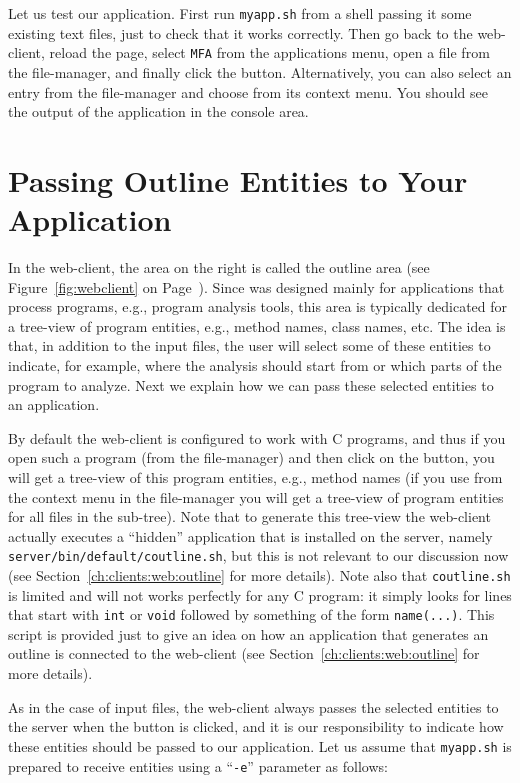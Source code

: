 Let us test our application. First run \texttt{myapp.sh} from a shell
passing it some existing text files, just to check that it works
correctly.
%
Then go back to the web-client, reload the page, select \texttt{MFA}
from the applications menu, open a file from the file-manager, and
finally click the \applybutton button. Alternatively, you can also
select an entry from the file-manager and choose \applybutton from its
context menu. You should see the output of the application in the
console area.

\section{Passing Outline Entities to Your Application}

In the web-client, the area on the right is called the outline area
(see Figure~\ref{fig:webclient} on Page~\pageref{fig:webclient}).
%
Since \ei was designed mainly for applications that process programs,
e.g., program analysis tools, this area is typically dedicated for a
tree-view of program entities, e.g., method names, class names, etc.
%
The idea is that, in addition to the input files, the user will select
some of these entities to indicate, for example, where the analysis
should start from or which parts of the program to analyze.
%
Next we explain how we can pass these selected entities to an
application.

By default the web-client is configured to work with C programs, and
thus if you open such a program (from the file-manager) and then click
on the  button, you will get a tree-view of this
program entities, e.g., method names (if you use  from
the context menu in the file-manager you will get a tree-view of
program entities for all files in the sub-tree).
%
Note that to generate this tree-view the web-client actually executes
a ``hidden'' application that is installed on the server, namely
\texttt{server/bin/default/coutline.sh}, but this is not relevant to
our discussion now (see Section~\ref{ch:clients:web:outline} for more
details).
%
Note also
that \texttt{coutline.sh} is limited and will not works perfectly for
any C program: it simply looks for lines that start with \texttt{int}
or \texttt{void} followed by something of the form
\texttt{name(...)}. 
%
This script is provided just to give an idea on how an application
that generates an outline is connected to the web-client (see
Section~\ref{ch:clients:web:outline} for more details).

As in the case of input files, the web-client always passes the
selected entities to the server when the \applybutton button is
clicked, and it is our responsibility to indicate how these entities
should be passed to our application. 
%
Let us assume that \texttt{myapp.sh} is prepared to receive entities
using a ``\texttt{-e}'' parameter as follows:

